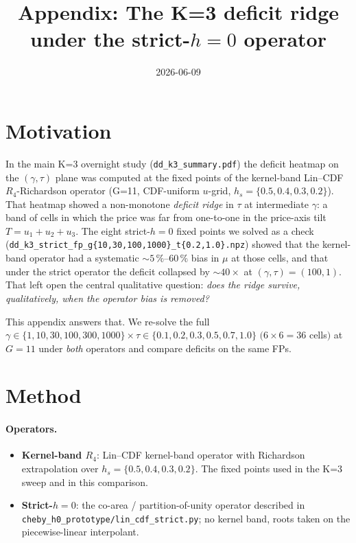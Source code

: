 \documentclass[11pt]{article}
\title{Appendix: The K=3 deficit ridge under the strict-$h{=}0$ operator}
\author{}
\date{2026-06-09}
\begin{document}
\maketitle

\section{Motivation}

In the main K=3 overnight study (\texttt{dd\_k3\_summary.pdf}) the deficit
heatmap on the $(\gamma,\tau)$ plane was computed at the fixed points of the
kernel-band Lin--CDF $R_4$-Richardson operator (G=11, CDF-uniform $u$-grid,
$h_s=\{0.5,0.4,0.3,0.2\}$). That heatmap showed a non-monotone
\emph{deficit ridge} in $\tau$ at intermediate $\gamma$: a band of cells in
which the price was far from one-to-one in the price-axis tilt $T = u_1 + u_2 + u_3$.
The eight strict-$h{=}0$ fixed points we solved as a check
(\texttt{dd\_k3\_strict\_fp\_g\{10,30,100,1000\}\_t\{0.2,1.0\}.npz}) showed
that the kernel-band operator had a systematic
$\sim 5\,\%$--$60\,\%$ bias in $\mu$ at those cells, and that under the strict
operator the deficit collapsed by $\sim\!40\times$ at $(\gamma,\tau)=(100,1)$.
That left open the central qualitative question:
\emph{does the ridge survive, qualitatively, when the operator bias is removed?}

This appendix answers that. We re-solve the full
$\gamma\in\{1,10,30,100,300,1000\}\times\tau\in\{0.1,0.2,0.3,0.5,0.7,1.0\}$
$(6\times 6 = 36$ cells$)$ at $G=11$ under \emph{both} operators and
compare deficits on the same FPs.

\section{Method}

\paragraph{Operators.}
\begin{itemize}
  \item \textbf{Kernel-band $R_4$}: Lin--CDF kernel-band operator with
        Richardson extrapolation over $h_s=\{0.5,0.4,0.3,0.2\}$. The fixed
        points used in the K=3 sweep and in this comparison.
  \item \textbf{Strict-$h{=}0$}: the co-area / partition-of-unity operator
        described in \texttt{cheby\_h0\_prototype/lin\_cdf\_strict.py}; no
        kernel band, roots taken on the piecewise-linear interpolant.
\end{itemize}
\end{document}
